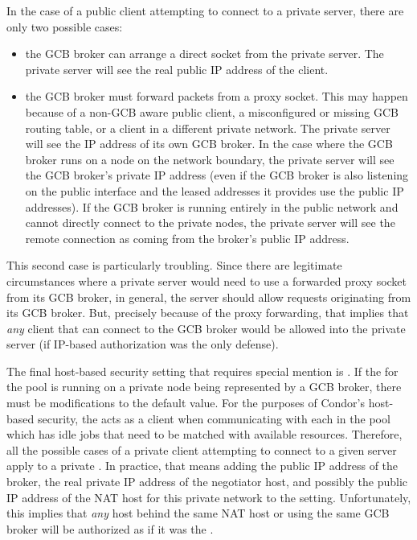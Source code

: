 In the case of a public client attempting to connect to a private
server, there are only two possible cases:

\begin{itemize}

  \item the GCB broker can arrange a direct socket from the private server.
  The private server will see the real public IP address of the client.

  \item the GCB broker must forward packets from a proxy socket.
  This may happen because
  of a non-GCB aware public client,
  a misconfigured or missing GCB routing table,
  or a client in a different private network.
  The private server will see the IP address of its own GCB broker.
  In the case where the GCB broker runs on a node on the network
  boundary, the private server will see the GCB broker's private IP
  address (even if the GCB broker is also listening on the public
  interface and the leased addresses it provides use the public IP
  addresses). 
  If the GCB broker is running entirely in the public network and cannot
  directly connect to the private nodes, the private server will see
  the remote connection as coming from the broker's public IP
  address.

\end{itemize}

This second case is particularly troubling.
Since there are legitimate circumstances where a private server would
need to use a forwarded proxy socket from its GCB broker, in general,
the server should allow requests originating from its GCB broker.
But, precisely because of the proxy forwarding, that implies that
\emph{any} client
that can connect to the GCB broker would be allowed into the
private server
(if IP-based authorization was the only defense).

The final host-based security setting that requires special mention is
.
If the  for the pool is running on a private node
being represented by a GCB broker, there must be
modifications to the default value.
For the purposes of Condor's host-based security, the
 acts as a client when communicating with each 
 in the pool which has idle jobs that need to be
matched with available resources.
Therefore, all the possible cases of a private client attempting to
connect to a given server apply to a private .
In practice, that means adding the public IP address of the broker, the real
private IP address of the negotiator host, and possibly the 
public IP address of
the NAT host for this private network to the
 setting.
Unfortunately, this implies that \emph{any} host behind the
same NAT host or using
the same GCB broker will be authorized as if it was the
. 

